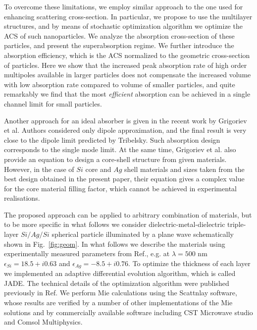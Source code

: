 \documentclass[twoside,twocolumn,9pt]{article}
\begin{document}
To overcome these limitations, we employ similar approach to the one
used for enhancing scattering cross-section.\cite{Fan-2011} In
particular, we propose to use the multilayer structures, and by means
of stochastic optimization algorithm\cite{Jingqiao-JADE-2009} we
optimize the ACS of such nanoparticles. We analyze the absorption
cross-section of these particles, and present the superabsorption
regime. We further introduce the absorption efficiency, which is the
ACS normalized to the geometric cross-section of particles.  Here we
show that the increased peak absorption rate of high order multipoles
available in larger particles does not compensate the increased volume
with low absorption rate compared to volume of smaller particles, and
quite remarkably we find that the most {\em efficient} absorption can
be achieved in a single channel limit for small particles.

Another approach for an ideal absorber is given in the recent work by
Grigoriev et al.\cite{Grigoriev-2015} Authors considered only dipole
approximation, and the final result is very close to the dipole limit
predicted by Tribelsky.\cite{Tribelsky-2011}  Such absorption design
corresponds to the single mode limit.  At the same time, Grigoriev et
al.\cite{Grigoriev-2015} also provide an equation to design a
core-shell structure from given materials. However, in the case of
$Si$ core and $Ag$ shell materials and sizes taken from the best
design obtained in the present paper, their equation gives a complex
value for the core material filling factor, which cannot be achieved
in experimental realisations.

\begin{figure}[h]
\end{figure}

The proposed approach can be applied to arbitrary combination of
materials, but to be more specific in what follows we consider
dielectric-metal-dielectric triple-layer $Si/Ag/Si$ spherical particle
illuminated by a plane wave schematically shown in
Fig.~\ref{fig:geom}. In what follows we describe the materials using
experimentally measured parameters from Ref.,\cite{palik-1997}
e.g. at $\lambda = 500$ nm $\epsilon_{Si} = 18.5 + i0.63$ and
$\epsilon_{Ag} = -8.5 + i0.76$.  To optimize the thickness of each
layer we implemented\cite{JADE-web} an adaptive differential
evolution algorithm,\cite{Storn-DE-first-1997} which is called
JADE.\cite{Jingqiao-JADE-2009}  The technical details of the
optimization algorithm were published previously in
Ref.\cite{Ladutenko-2014} We perform Mie calculations using the
Scattnlay software,\cite{Pena-scattnlay-2009,Scattnlay-web} whose
results are verified by a number of other implementations of the Mie
solutions and by commercially available software including CST
Microwave studio\cite{CST-web} and Comsol
Multiphysics.\cite{Comsol-web}
\end{document}

